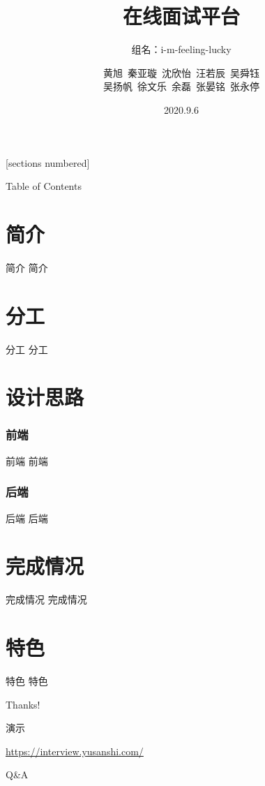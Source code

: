 \documentclass[aspectratio=169,10pt]{beamer}
\title{\huge 在线面试平台}
\subtitle{\small 组名：i-m-feeling-lucky}
\author{黄旭\, 秦亚璇\, 沈欣怡\, 汪若辰\, 吴舜钰\\
吴扬帆\, 徐文乐\, 余磊\, 张晏铭\, 张永停}
\date{2020.9.6}
\begin{document}
\maketitle

[sections numbered]

\begin{frame}{Table of Contents}
  \tableofcontents
\end{frame}

\section{简介}
\begin{frame}{简介}
  简介
\end{frame}

\section{分工}
\begin{frame}{分工}
  分工
\end{frame}

\section{设计思路}
\subsubsection{前端}
\begin{frame}{前端}
  前端
\end{frame}
\subsubsection{后端}
\begin{frame}{后端}
  后端
\end{frame}

\section{完成情况}
\begin{frame}{完成情况}
  完成情况
\end{frame}

\section{特色}
\begin{frame}{特色}
  特色
\end{frame}

\begin{frame}[standout]
  \huge Thanks!
\end{frame}

\appendix

\begin{frame}{演示}
  \begin{center}\large \url{https://interview.yusanshi.com/}\end{center}
\end{frame}

\begin{frame}[standout]
  \huge Q\&A
\end{frame}
\end{document}
